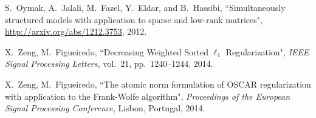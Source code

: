 \documentclass[journal]{IEEEtran}
\begin{document}
\begin{thebibliography}{20}
		 S.~Oymak, A.~Jalali, M.~Fazel, Y.~Eldar, and B.~Hassibi, ``Simultaneously structured models with application to sparse and low-rank matrices", \url{http://arxiv.org/abs/1212.3753}, 2012.
		
		X.~Zeng, M.~Figueiredo, ``Decreasing Weighted Sorted $\ell_1$ Regularization", {\em IEEE Signal Processing Letters,} vol.~21, pp.~1240--1244, 2014.
		
		X.~Zeng, M.~Figueiredo, ``The atomic norm formulation of OSCAR regularization with application to the Frank-Wolfe algorithm", {\em Proceedings of the European Signal Processing Conference}, Lisbon, Portugal, 2014.
		
		
		
	\end{thebibliography}
	
	
	
	
	
	
	
	
	
	
	
\end{document}
